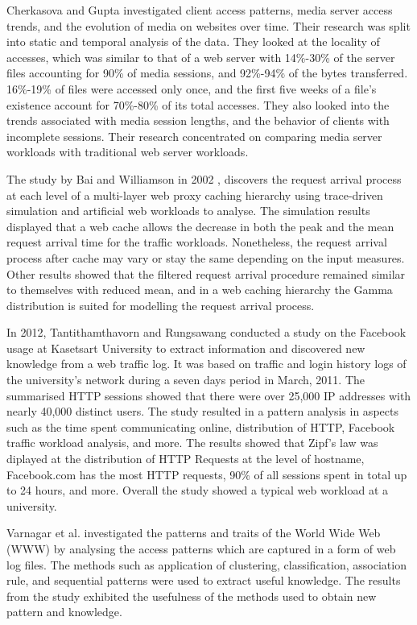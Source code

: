 \documentclass[10pt,conference]{IEEEtran}
\begin{document}
Cherkasova and Gupta \cite{Cherkasova} investigated client access patterns, media server access trends, and the evolution of media on websites over time. Their research was split into static and temporal analysis of the data. They looked at the locality of accesses, which was similar to that of a web server with 14\%-30\% of the server files accounting for 90\% of media sessions, and 92\%-94\% of the bytes transferred. 16\%-19\% of files were accessed only once, and the first five weeks of a file’s existence account for 70\%-80\% of its total accesses. They also looked into the trends associated with media session lengths, and the behavior of clients with incomplete sessions. Their research concentrated on comparing media server workloads with traditional web server workloads.

The study by Bai and Williamson in 2002 \cite{Bai}, discovers the request arrival process at each level of a multi-layer web proxy caching hierarchy using trace-driven simulation and artificial web workloads to analyse. The simulation results displayed that a web cache allows the decrease in both the peak and the mean request arrival time for the traffic workloads. Nonetheless, the request arrival process after cache may vary or stay the same depending on the input measures. Other results showed that the filtered request arrival procedure remained similar to themselves with reduced mean, and in a web caching hierarchy the Gamma distribution is suited for modelling the request arrival process.

In 2012, Tantithamthavorn and Rungsawang \cite{facebook} conducted a study on the Facebook usage at Kasetsart University to extract information and discovered new knowledge from a web traffic log. It was based on traffic and login history logs of the university’s network during a seven days period in March, 2011. The summarised HTTP sessions showed that there were over 25,000 IP addresses with nearly 40,000 distinct users. The study resulted in a pattern analysis in aspects such as the time spent communicating online, distribution of HTTP, Facebook traffic workload analysis, and more. The results showed that Zipf’s law was diplayed at the distribution of HTTP Requests at the level of hostname, Facebook.com has the most HTTP requests, 90\% of all sessions spent in total up to 24 hours, and more. Overall the study showed a typical web workload at a university.

Varnagar et al. \cite{Varnagar} investigated the patterns and traits of the World Wide Web (WWW) by analysing the access patterns which are captured in a form of web log files. The methods such as application of clustering, classification, association rule, and sequential patterns were used to extract useful knowledge. The results from the study exhibited the usefulness of the methods used to obtain new pattern and knowledge.
\end{document}
